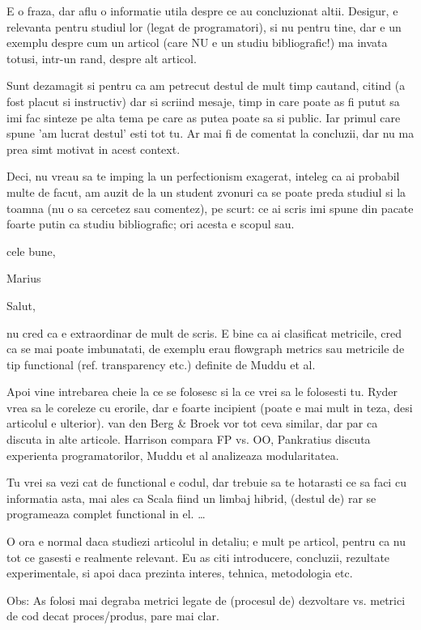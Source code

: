 \documentclass{article}
\begin{document}
E o fraza, dar aflu o informatie utila despre ce au concluzionat altii.
Desigur, e relevanta pentru studiul lor (legat de programatori), si
nu pentru tine, dar e un exemplu despre cum un articol (care NU e un
studiu bibliografic!) ma invata totusi, intr-un rand, despre alt articol.

Sunt dezamagit si pentru ca am petrecut destul de mult timp cautand,
citind (a fost placut si instructiv) dar si scriind mesaje, timp in care
poate as fi putut sa imi fac sinteze pe alta tema pe care as putea poate
sa si public. Iar primul care spune 'am lucrat destul' esti tot tu.
Ar mai fi de comentat la concluzii, dar nu ma prea simt motivat
in acest context.

Deci, nu vreau sa te imping la un perfectionism exagerat, inteleg ca
ai probabil multe de facut, am auzit de la un student zvonuri ca se
poate preda studiul si la toamna (nu o sa cercetez sau comentez),
pe scurt: ce ai scris imi spune din pacate foarte putin ca studiu
bibliografic; ori acesta e scopul sau.

cele bune,

Marius



Salut,

nu cred ca e extraordinar de mult de scris.
E bine ca ai clasificat metricile, cred ca se mai poate imbunatati,
de exemplu erau flowgraph metrics sau metricile de tip functional
(ref. transparency etc.) definite de Muddu et al.

Apoi vine intrebarea cheie la ce se folosesc si la ce vrei sa le
folosesti tu. Ryder vrea sa le coreleze cu erorile, dar e foarte
incipient (poate e mai mult in teza, desi articolul e ulterior).
van den Berg \& Broek vor tot ceva similar, dar par ca discuta in alte
articole. Harrison compara FP vs. OO, Pankratius discuta experienta
programatorilor, Muddu et al analizeaza modularitatea.

Tu vrei sa vezi cat de functional e codul, dar trebuie sa te hotarasti
ce sa faci cu informatia asta, mai ales ca Scala fiind un limbaj hibrid,
(destul de) rar se programeaza complet functional in el.
…




O ora e normal daca studiezi articolul in detaliu; e mult pe articol,
pentru ca nu tot ce gasesti e realmente relevant.
Eu as citi introducere, concluzii, rezultate experimentale, si apoi
daca prezinta interes, tehnica, metodologia etc.

Obs: As folosi mai degraba metrici legate de (procesul de) dezvoltare vs.
metrici de cod decat proces/produs, pare mai clar.
\end{document}
